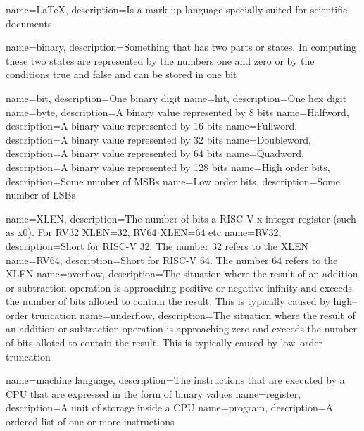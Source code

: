 {
    name=LaTeX,
    description={Is a mark up language specially suited
    for scientific documents}
}

{
	name=binary,
	description={Something that has two parts or states.  In computing
		these two states are represented by the numbers one and zero or
		by the conditions true and false and can be stored in one bit}
}

{
	name=bit,
	description={One binary digit}
}
{
	name={hit},
	description={One hex digit}
}
{
	name=byte,
	description={A binary value represented by 8 bits}
}
{
	name={Halfword},
	description={A binary value represented by 16 bits}
}
{
	name={Fullword},
	description={A binary value represented by 32 bits}
}
{
	name={Doubleword},
	description={A binary value represented by 64 bits}
}
{
	name={Quadword},
	description={A binary value represented by 128 bits}
}
{
	name={High order bits},
	description={Some number of MSBs}
}
{
    name={Low order bits},
    description={Some number of LSBs}
}

{
	name=XLEN,
	description={The number of bits a RISC-V x integer register 
		(such as x0).  For RV32 XLEN=32, RV64 XLEN=64 etc}
}
{
	name=RV32,
	description={Short for RISC-V 32.  The number 32 refers to the XLEN}
}
{
	name=RV64,
	description={Short for RISC-V 64.  The number 64 refers to the XLEN}
}
{
	name=overflow,
	description={The situation where the result of an addition or 
		subtraction operation is approaching positive or negative 
		infinity and exceeds the number of bits alloted to contain 
		the result.  This is typically caused by high--order truncation}
}
{
	name=underflow,
	description={The situation where the result of an addition or 
		subtraction operation is approaching zero and exceeds the number 
		of bits alloted to contain the result.  This is typically
        caused by low--order truncation}
}

{
	name={machine language},
	description={The instructions that are executed by a CPU that are expressed
		in the form of binary values}
}
{
	name={register},
	description={A unit of storage inside a CPU}
}
{
	name={program},
	description={A ordered list of one or more instructions}
}






